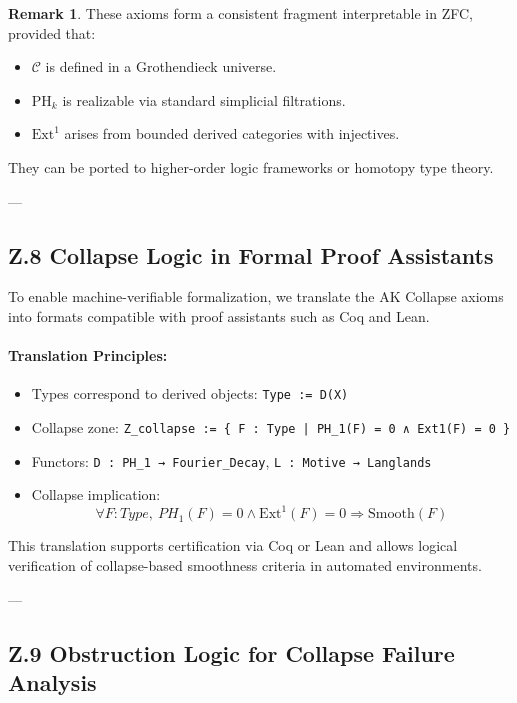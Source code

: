 \documentclass[11pt]{article}
\theoremstyle{definition}
\newtheorem{remark}[theorem]{Remark}
\begin{document}
\begin{remark}
These axioms form a consistent fragment interpretable in ZFC, provided that:
\begin{itemize}
  \item $\mathcal{C}$ is defined in a Grothendieck universe.
  \item $\mathrm{PH}_k$ is realizable via standard simplicial filtrations.
  \item $\mathrm{Ext}^1$ arises from bounded derived categories with injectives.
\end{itemize}
They can be ported to higher-order logic frameworks or homotopy type theory.
\end{remark}

---

\subsection*{Z.8 Collapse Logic in Formal Proof Assistants}

To enable machine-verifiable formalization, we translate the AK Collapse axioms into formats compatible with proof assistants such as Coq and Lean.

\paragraph{Translation Principles:}
\begin{itemize}
  \item Types correspond to derived objects: \texttt{Type := D(X)}
  \item Collapse zone: \texttt{Z\_collapse := \{ F : Type | PH\_1(F) = 0 ∧ Ext1(F) = 0 \}}
  \item Functors: \texttt{D : PH\_1 → Fourier\_Decay}, \quad \texttt{L : Motive → Langlands}
  \item Collapse implication: 
  \[
  \forall F : Type, \ PH_1(F) = 0 \land \mathrm{Ext}^1(F) = 0 \Rightarrow \mathrm{Smooth}(F)
  \]
\end{itemize}

This translation supports certification via Coq or Lean and allows logical verification of collapse-based smoothness criteria in automated environments.

---

\subsection*{Z.9 Obstruction Logic for Collapse Failure Analysis}
\end{document}
